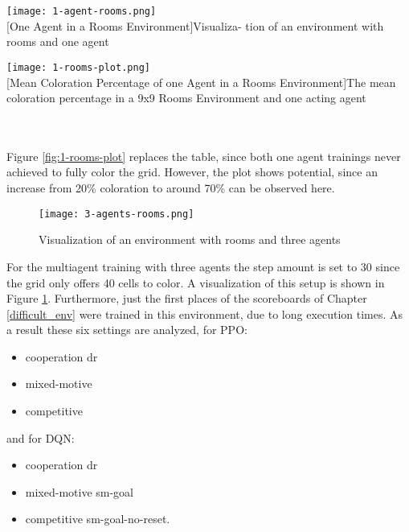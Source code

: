 \begin{minipage}{\textwidth}
  \begin{minipage}[b]{0.29\textwidth}
    \centering
    \texttt{[image: 1-agent-rooms.png]}\\
    [One Agent in a Rooms Environment]{Visualiza- tion of an environment with rooms and one agent}\label{fig:1-agent-rooms}
  \end{minipage}
  \hfill
  \begin{minipage}[b]{0.69\textwidth}
    \centering
    \texttt{[image: 1-rooms-plot.png]}\\
    [Mean Coloration Percentage of one Agent in a Rooms Environment]{The mean coloration percentage in a 9x9 Rooms Environment and one acting agent \\}\label{fig:1-rooms-plot}
    \end{minipage}
  \end{minipage}\\\\

Figure \ref{fig:1-rooms-plot} replaces the table, since both one agent trainings never achieved to fully color the grid. However, the plot shows potential, since an increase from 20\% coloration to around 70\% can be observed here.

\begin{figure}[hpbt]
    \centering
    \texttt{[image: 3-agents-rooms.png]}\\
    \caption[Three Agents in a Rooms Environment]{Visualization of an environment with rooms and three agents}\label{fig:3-agents-rooms}
\end{figure}

For the multiagent training with three agents the step amount is set to 30 since the grid only offers 40 cells to color. A visualization of this setup is shown in Figure \ref{fig:3-agents-rooms}. Furthermore, just the first places of the scoreboards of Chapter \ref{difficult_env} were trained in this environment, due to long execution times. As a result these six settings are analyzed, for PPO:
\begin{itemize}
    \item cooperation dr
    \item mixed-motive
    \item competitive
\end{itemize}
    and for DQN:
\begin{itemize}
    \item cooperation dr
    \item mixed-motive sm-goal
    \item competitive sm-goal-no-reset.
\end{itemize}


